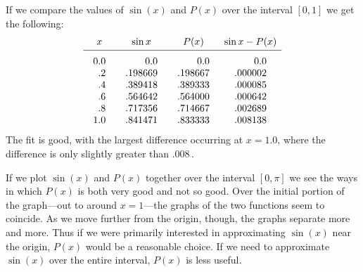 {{{{If we compare the values of $\sin(x)$ and $P(x)$ over the interval $[0, 1]$ we get the following:
\[
\begin{array}{cccc}
        x  & \sin{x} & P(x) &\sin{x}-P(x)\\ [2pt] \hline
        \begin{array}{r}
        \rule{0pt}{14pt} 0.0\\ .2 \\ .4 \\ .6 \\ .8 \\ 1.0 
        \end{array}
        &
        \begin{array}{r}
        \rule{0pt}{14pt} 0.0 \\ .198669 \\ .389418 \\ .564642 \\ .717356 \\ .841471  
        \end{array}
        &
        \begin{array}{r}
        \rule{0pt}{14pt} 0.0 \\ .198667 \\ .389333 \\ .564000 \\ .714667 \\ .833333
        \end{array}
        &
        \begin{array}{r}
        \rule{0pt}{14pt} 0.0 \\ .000002 \\ .000085 \\ .000642 \\ .002689 \\ .008138  
        \end{array}
        \end{array}
\]
The fit is good, with the largest difference occurring at $x=1.0$, where the difference is only slightly greater than .008\,.

If we plot $\sin(x)$ and $P(x)$ together over the interval $[0, \pi]$ we see the ways in which $P(x)$ is both very good and not so good.  Over the initial portion of the graph---out to around $x=1$---the graphs of the two functions seem to coincide. As we move further from the origin, though, the graphs separate more and more.  Thus if we were primarily interested in approximating $\sin(x)$ near the origin, $P(x)$ would be a reasonable choice.  If we need to approximate $\sin(x)$ over the entire interval, $P(x)$ is less useful.

}}}}

